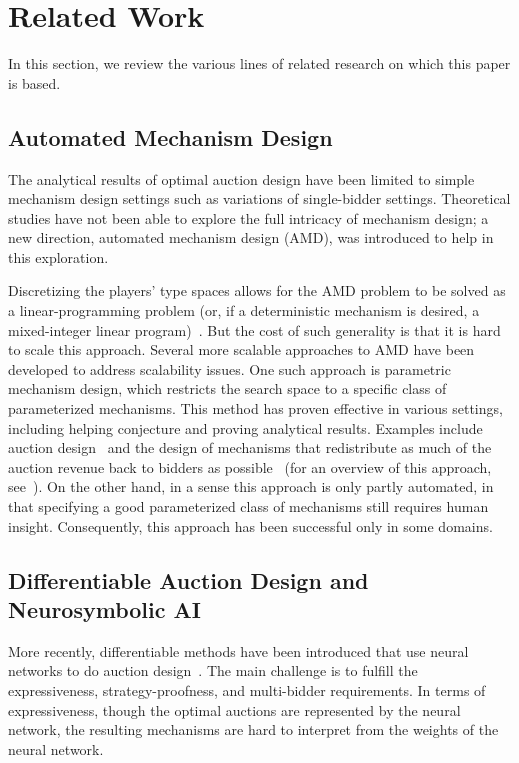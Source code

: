 \section{Related Work}
\label{sec:relatedwork}

In this section, we review the various lines of related research on which this paper is based.

\subsection{Automated Mechanism Design}
The analytical results of optimal auction design have been limited to simple mechanism design settings such as variations of single-bidder settings. Theoretical studies have not been able to explore the full intricacy of mechanism design; a new direction, automated mechanism design (AMD), was introduced to help in this exploration. 

Discretizing the players' type spaces allows for the AMD problem to be solved as a linear-programming problem (or, if a deterministic mechanism is desired, a mixed-integer linear program)~\cite{Conitzer02:Complexity,Conitzer04:Self,conitzer2003applications}.
But the cost of such generality is that it is hard to scale this approach.
Several more scalable approaches to AMD have been developed to address scalability issues. One such approach is parametric mechanism design, which restricts the search space to a specific class of parameterized mechanisms. This method has proven effective in various settings, including helping conjecture and proving analytical results. Examples include auction design~\cite{Sandholm15:Automated,sandholm2003automated} and the design of mechanisms that redistribute as much of the auction revenue back to bidders as possible~\cite{cavallo2008efficiency,guo2016competitive,guo2007worst,guo2008undominated,guo2024worst,guo2014better,guo2012worst,guo2011vcg,guo2010optimal,guo2008better} (for an overview of this approach, see~\cite{Guo10:Computationally}).  
On the other hand, in a sense this approach is only partly automated, in that specifying a good parameterized class of mechanisms still requires human insight. Consequently, this approach has been successful only in some domains. 



\subsection{Differentiable Auction Design and Neurosymbolic AI} 
More recently, differentiable methods have been introduced that use neural networks to do auction design~\cite{RochetNet,GEMNet,shen2018automated,rahme2021permutation,feng2018deep}. The main challenge is to fulfill the expressiveness, strategy-proofness, and multi-bidder requirements. In terms of expressiveness, though the optimal auctions are represented by the neural network, the resulting mechanisms are hard to interpret from the weights of the neural network.

